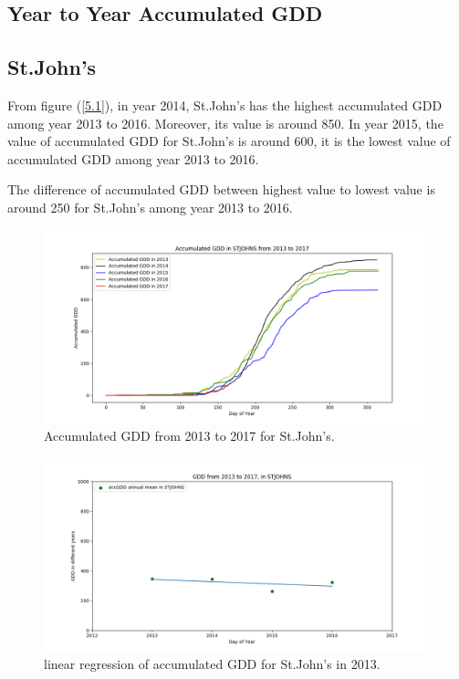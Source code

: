 \documentclass[12pt]{article}
\begin{document}
\subsection{ \bf Year to Year Accumulated GDD }
\subsection{St.John's}

From figure (\ref{5.1}), in year 2014, St.John's has the highest accumulated GDD among year 2013 to 2016. Moreover, its value is around 850. In year 2015, the value of accumulated GDD for St.John's is around 600, it is the lowest value of accumulated GDD among year 2013 to 2016. 

The difference of accumulated GDD between highest value to lowest value is around 250 for St.John's among year 2013 to 2016.

\begin{center}
\begin{figure}[H]
\includegraphics[width=5.25in]{../Plot/STJOHNS/accGDD_2013_2017.png}

\caption{Accumulated GDD from 2013 to 2017 for St.John's.}
\label{9}
\end{figure}
\end{center}

\begin{center}
\begin{figure}[H]
\includegraphics[width=5.25in]{../Plot/STJOHNS/GDD_LinearRegression_STJOHNS.png}
\caption{linear regression of accumulated GDD for  St.John's in 2013.}
\label{10}
\end{figure}
\end{center}
\end{document}
